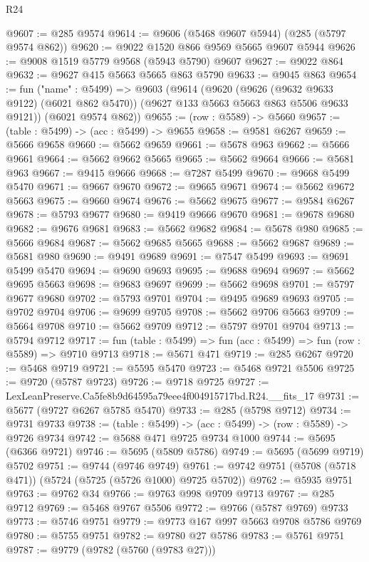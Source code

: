 \begin{lexlean}{R24}
\begin{coremodule}
@9607 := @285 @9574
@9614 := @9606 (@5468 @9607 @5944) (@285 (@5797 @9574 @862))
@9620 := @9022 @1520 @866 @9569 @5665 @9607 @5944
@9626 := @9008 @1519 @5779 @9568 (@5943 @5790) @9607
@9627 := @9022 @864
@9632 := @9627 @415 @5663 @5665 @863 @5790
@9633 := @9045 @863
@9654 := fun ("name" : @5499) =>
  @9603
    (@9614
      (@9620
        (@9626 (@9632 @9633 @9122) (@6021 @862 @5470))
        (@9627 @133 @5663 @5663 @863 @5506 @9633 @9121))
      (@6021 @9574 @862))
@9655 := (row : @5589) -> @5660
@9657 := (table : @5499) -> (acc : @5499) -> @9655
@9658 := @9581 @6267
@9659 := @5666 @9658
@9660 := @5662 @9659
@9661 := @5678 @963
@9662 := @5666 @9661
@9664 := @5662 @9662 @5665
@9665 := @5662 @9664
@9666 := @5681 @963
@9667 := @9415 @9666
@9668 := @7287 @5499
@9670 := @9668 @5499 @5470
@9671 := @9667 @9670
@9672 := @9665 @9671
@9674 := @5662 @9672 @5663
@9675 := @9660 @9674
@9676 := @5662 @9675
@9677 := @9584 @6267
@9678 := @5793 @9677
@9680 := @9419 @9666 @9670
@9681 := @9678 @9680
@9682 := @9676 @9681
@9683 := @5662 @9682
@9684 := @5678 @980
@9685 := @5666 @9684
@9687 := @5662 @9685 @5665
@9688 := @5662 @9687
@9689 := @5681 @980
@9690 := @9491 @9689
@9691 := @7547 @5499
@9693 := @9691 @5499 @5470
@9694 := @9690 @9693
@9695 := @9688 @9694
@9697 := @5662 @9695 @5663
@9698 := @9683 @9697
@9699 := @5662 @9698
@9701 := @5797 @9677 @9680
@9702 := @5793 @9701
@9704 := @9495 @9689 @9693
@9705 := @9702 @9704
@9706 := @9699 @9705
@9708 := @5662 @9706 @5663
@9709 := @5664 @9708
@9710 := @5662 @9709
@9712 := @5797 @9701 @9704
@9713 := @5794 @9712
@9717 := fun (table : @5499) => fun (acc : @5499) => fun (row : @5589) => @9710 @9713
@9718 := @5671 @471
@9719 := @285 @6267
@9720 := @5468 @9719
@9721 := @5595 @5470
@9723 := @5468 @9721 @5506
@9725 := @9720 (@5787 @9723)
@9726 := @9718 @9725
@9727 := LexLeanPreserve.Ca5fe8b9d64595a79eee4f004915717bd.R24.__fits_17
@9731 := @5677 (@9727 @6267 @5785 @5470)
@9733 := @285 (@5798 @9712)
@9734 := @9731 @9733
@9738 := (table : @5499) -> (acc : @5499) -> (row : @5589) -> @9726 @9734
@9742 := @5688 @471 @9725 @9734 @1000
@9744 := @5695 (@6366 @9721)
@9746 := @5695 (@5809 @5786)
@9749 := @5695 (@5699 @9719) @5702
@9751 := @9744 (@9746 @9749)
@9761 := @9742 @9751 (@5708 (@5718 @471)) (@5724 (@5725 (@5726 @1000) @9725 @5702))
@9762 := @5935 @9751
@9763 := @9762 @34
@9766 := @9763 @998 @9709 @9713
@9767 := @285 @9712
@9769 := @5468 @9767 @5506
@9772 := @9766 (@5787 @9769) @9733
@9773 := @5746 @9751
@9779 := @9773 @167 @997 @5663 @9708 @5786 @9769
@9780 := @5755 @9751
@9782 := @9780 @27 @5786
@9783 := @5761 @9751
@9787 := @9779 (@9782 (@5760 (@9783 @27)))

\end{coremodule}
\end{lexlean}
